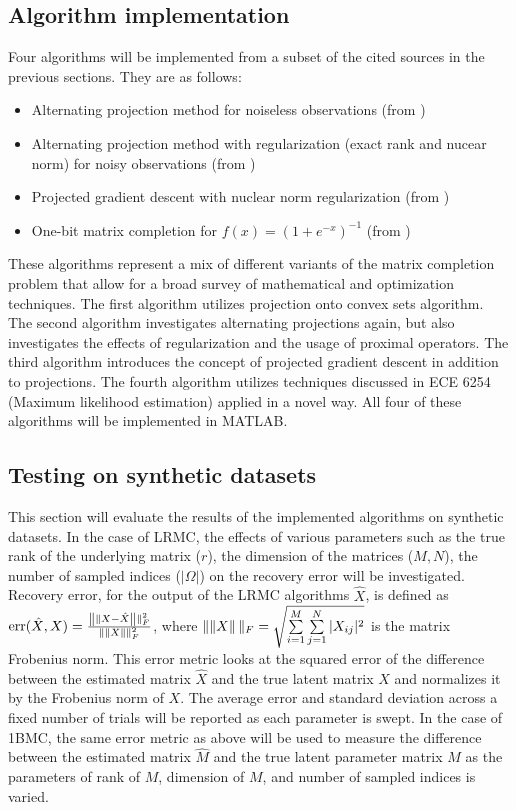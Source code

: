 \subsection{{Algorithm implementation}} Four algorithms will be implemented from a subset of the cited sources in the previous sections. They are as follows: 
\begin{itemize}
    \item Alternating projection method for noiseless observations (from \cite{fessler_2019})
    \item Alternating projection method with regularization (exact rank and nucear norm) for noisy observations (from \cite{fessler_2019})
    \item Projected gradient descent with nuclear norm regularization (from \cite{cai2010singular})
    \item One-bit matrix completion for $f(x) = (1 + e^{-x})^{-1}$ (from \cite{davenport20141})
\end{itemize}
These algorithms represent a mix of different variants of the matrix completion problem that allow for a broad survey of mathematical and optimization techniques. The first algorithm utilizes projection onto convex sets algorithm. The second algorithm investigates alternating projections again, but also investigates the effects of regularization and the usage of proximal operators. The third algorithm introduces the concept of projected gradient descent in addition to projections. The fourth algorithm utilizes techniques discussed in ECE 6254 (Maximum likelihood estimation) applied in a novel way. All four of these algorithms will be implemented in MATLAB.

\subsection{{Testing on synthetic datasets}} This section will evaluate the results of the implemented algorithms on synthetic datasets. In the case of LRMC, the effects of various parameters such as the true rank of the underlying matrix ($r$), the dimension of the matrices ($M, N$), the number of sampled indices ($|\Omega|$) on the recovery error will be investigated. Recovery error, for the output of the LRMC algorithms $\hat{X}$, is defined as $\text{err}(\hat{X}, X) = \frac{\left\|\|X - \hat{X}\right\|\|_F^2}{\left\|\|X\right\|\|_F^2}$, where $\left\|\|X\right\|\|_F = \sqrt{\sum\limits_{i = 1}^M\sum\limits_{j = 1}^N |X_{ij}|^2}$ is the matrix Frobenius norm. This error metric looks at the squared error of the difference between the estimated matrix $\hat{X}$ and the true latent matrix $X$ and normalizes it by the Frobenius norm of $X$. The average error and standard deviation across a fixed number of trials will be reported as each parameter is swept. In the case of 1BMC, the same error metric as above will be used to measure the difference between the estimated matrix $\hat{M}$ and the true latent parameter matrix $M$ as the parameters of rank of $M$, dimension of $M$, and number of sampled indices is varied.
